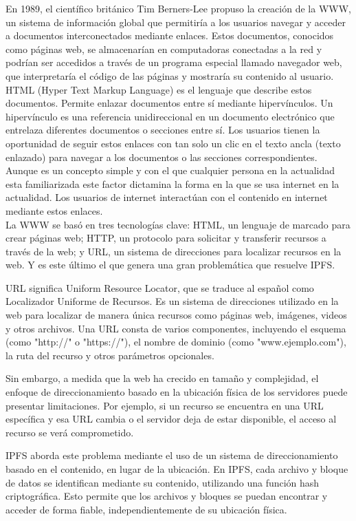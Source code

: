 En 1989, el científico británico Tim Berners-Lee propuso la creación de la WWW, un sistema de información
global que permitiría a los usuarios navegar y acceder a documentos interconectados mediante
enlaces. Estos documentos, conocidos como páginas web, se almacenarían en computadoras conectadas a la red y podrían ser accedidos
a través de un programa especial llamado navegador web, que interpretaría el código de las páginas y mostraría su contenido al usuario.
\\HTML (Hyper Text Markup Language) es el lenguaje que describe estos documentos. Permite enlazar documentos entre sí mediante hipervínculos. Un hipervínculo es una referencia unidireccional en un documento electrónico que entrelaza diferentes documentos o secciones entre sí. Los usuarios tienen la oportunidad de seguir estos enlaces con tan solo un clic en el texto ancla (texto enlazado) para navegar a los documentos o las secciones correspondientes\cite{Hiperenlace2023}.
Aunque es un concepto simple y con el que cualquier persona en la actualidad esta familiarizada este factor dictamina la forma
en la que se usa internet en la actualidad. Los usuarios de internet interactúan con el contenido en internet mediante estos enlaces.
\\La WWW se basó en tres tecnologías clave: HTML, un lenguaje de marcado para crear páginas web; HTTP, un protocolo para solicitar y transferir recursos a través de la web; y URL, un sistema de direcciones para localizar recursos en la web\cite{leinerBriefHistoryInternet1999}. Y es este último el que genera una gran problemática que resuelve IPFS.

URL significa Uniform Resource Locator, que se traduce al español como Localizador Uniforme de Recursos. Es un sistema de direcciones utilizado en la web para localizar de manera única recursos como páginas web, imágenes, videos y otros archivos. Una URL consta de varios componentes, incluyendo el esquema (como "http://" o "https://"), el nombre de dominio (como "www.ejemplo.com"), la ruta del recurso y otros parámetros opcionales.

\setlength{\parskip}{10pt}
Sin embargo, a medida que la web ha crecido en tamaño y complejidad, el enfoque de direccionamiento basado en la ubicación física
de los servidores puede presentar limitaciones. Por ejemplo, si un recurso se encuentra en una URL específica y esa URL cambia o
el servidor deja de estar disponible, el acceso al recurso se verá comprometido.

IPFS aborda este problema mediante el uso de un sistema de direccionamiento basado en el contenido, en lugar de la ubicación. En
IPFS, cada archivo y bloque de datos se identifican mediante su contenido, utilizando una función hash criptográfica. Esto
permite que los archivos y bloques se puedan encontrar y acceder de forma fiable, independientemente de su ubicación física.

